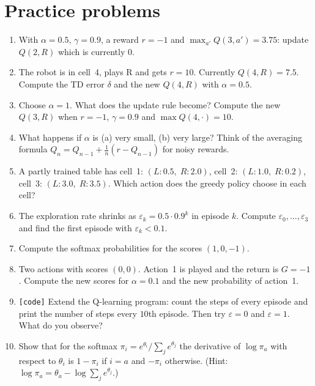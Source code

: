 \section*{Practice problems}
\begin{enumerate}[label=\textbf{\thechapter.\arabic*}]
  \item With $\alpha=0.5$, $\gamma=0.9$, a reward $r=-1$ and $\max_{a'}Q(3,a')=3.75$: update $Q(2,R)$ which is currently $0$.
  \item The robot is in cell~4, plays R and gets $r=10$. Currently $Q(4,R)=7.5$. Compute the TD error $\delta$ and the new $Q(4,R)$ with $\alpha=0.5$.
  \item Choose $\alpha=1$. What does the update rule become? Compute the new $Q(3,R)$ when $r=-1$, $\gamma=0.9$ and $\max Q(4,\cdot)=10$.
  \item What happens if $\alpha$ is (a) very small, (b) very large? Think of the averaging formula $Q_n=Q_{n-1}+\frac1n(r-Q_{n-1})$ for noisy rewards.
  \item A partly trained table has cell~1: $(L:0.5,\;R:2.0)$, cell~2: $(L:1.0,\;R:0.2)$, cell~3: $(L:3.0,\;R:3.5)$. Which action does the greedy policy choose in each cell?
  \item The exploration rate shrinks as $\varepsilon_k=0.5\cdot0.9^k$ in episode $k$. Compute $\varepsilon_0,\dots,\varepsilon_3$ and find the first episode with $\varepsilon_k<0.1$.
  \item Compute the softmax probabilities for the scores $(1,0,-1)$.
  \item Two actions with scores $(0,0)$. Action~1 is played and the return is $G=-1$. Compute the new scores for $\alpha=0.1$ and the new probability of action~1.
  \item \texttt{[code]} Extend the Q-learning program: count the steps of every episode and print the number of steps every $10$th episode. Then try $\varepsilon=0$ and $\varepsilon=1$. What do you observe?
  \item[\textbf{\thechapter.10}$\star$] Show that for the softmax $\pi_i=e^{\theta_i}/\sum_je^{\theta_j}$ the derivative of $\log\pi_a$ with respect to $\theta_i$ is $1-\pi_i$ if $i=a$ and $-\pi_i$ otherwise. (Hint: $\log\pi_a=\theta_a-\log\sum_je^{\theta_j}$.)
\end{enumerate}
